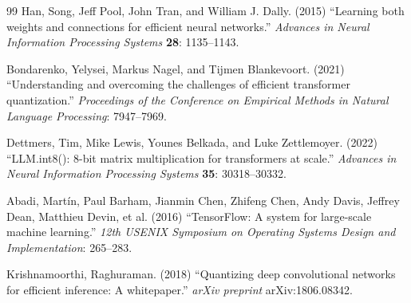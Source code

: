 \documentclass[3p,times,procedia]{elsarticle}
\begin{document}
\begin{thebibliography}{99}
Han, Song, Jeff Pool, John Tran, and William J. Dally. (2015) ``Learning both weights and connections for efficient neural networks.'' {\it Advances in Neural Information Processing Systems} {\bf 28}: 1135--1143.

Bondarenko, Yelysei, Markus Nagel, and Tijmen Blankevoort. (2021) ``Understanding and overcoming the challenges of efficient transformer quantization.'' {\it Proceedings of the Conference on Empirical Methods in Natural Language Processing}: 7947--7969.

Dettmers, Tim, Mike Lewis, Younes Belkada, and Luke Zettlemoyer. (2022) ``LLM.int8(): 8-bit matrix multiplication for transformers at scale.'' {\it Advances in Neural Information Processing Systems} {\bf 35}: 30318--30332.

Abadi, Mart\'{i}n, Paul Barham, Jianmin Chen, Zhifeng Chen, Andy Davis, Jeffrey Dean, Matthieu Devin, et al. (2016) ``TensorFlow: A system for large-scale machine learning.'' {\it 12th USENIX Symposium on Operating Systems Design and Implementation}: 265--283.

Krishnamoorthi, Raghuraman. (2018) ``Quantizing deep convolutional networks for efficient inference: A whitepaper.'' {\it arXiv preprint} arXiv:1806.08342.

\end{thebibliography}
\end{document}
